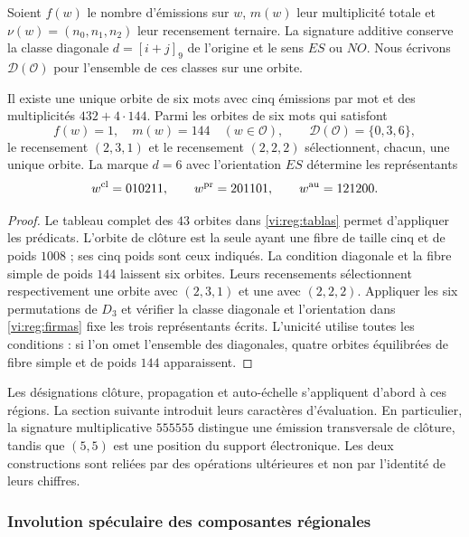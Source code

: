 Soient \(f(w)\) le nombre d’émissions sur \(w\), \(m(w)\)
leur multiplicité totale et \(\nu(w)=(n_0,n_1,n_2)\) leur recensement
ternaire. La signature additive conserve la classe diagonale
\(d=[i+j]_9\) de l’origine et le sens \(ES\) ou \(NO\).
Nous écrivons \(\mathcal D(\mathcal O)\) pour l’ensemble de ces
classes sur une orbite.

\begin{proposition}
\label{vi:reg:seleccion}
Il existe une unique orbite de six mots avec cinq émissions par
mot et des multiplicités \(432+4\cdot144\). Parmi les orbites
de six mots qui satisfont
\[
 f(w)=1,\quad m(w)=144\quad(w\in\mathcal O),\qquad
 \mathcal D(\mathcal O)=\{0,3,6\},
\]
le recensement \((2,3,1)\) et le recensement \((2,2,2)\) sélectionnent,
chacun, une unique orbite. La marque \(d=6\) avec l’orientation
\(ES\) détermine les représentants
\[
 w^{\rm cl}=010211,\qquad w^{\rm pr}=201101,
 \qquad w^{\rm au}=121200.
\]
\end{proposition}
\begin{proof}
Le tableau complet des \(43\) orbites dans
\ref{vi:reg:tablas} permet d’appliquer les prédicats. L’orbite de
clôture est la seule ayant une fibre de taille cinq et de poids \(1008\) ;
ses cinq poids sont ceux indiqués. La condition diagonale et la
fibre simple de poids \(144\) laissent six orbites. Leurs recensements
sélectionnent respectivement une orbite avec \((2,3,1)\) et une avec
\((2,2,2)\). Appliquer les six permutations de \(D_3\) et
vérifier la classe diagonale et l’orientation dans
\eqref{vi:reg:firmas} fixe les trois représentants écrits.
L’unicité utilise toutes les conditions : si l’on omet l’ensemble des
diagonales, quatre orbites équilibrées de fibre simple
et de poids \(144\) apparaissent.
\end{proof}

Les désignations clôture, propagation et auto-échelle s’appliquent
d’abord à ces régions. La section suivante introduit leurs
caractères d’évaluation. En particulier, la signature multiplicative
\(555555\) distingue une émission transversale de clôture, tandis
que \((5,5)\) est une position du support électronique. Les deux
constructions sont reliées par des opérations ultérieures et non
par l’identité de leurs chiffres.

\subsubsection{Involution spéculaire des composantes régionales}
\label{mono-ampl:regiones}


